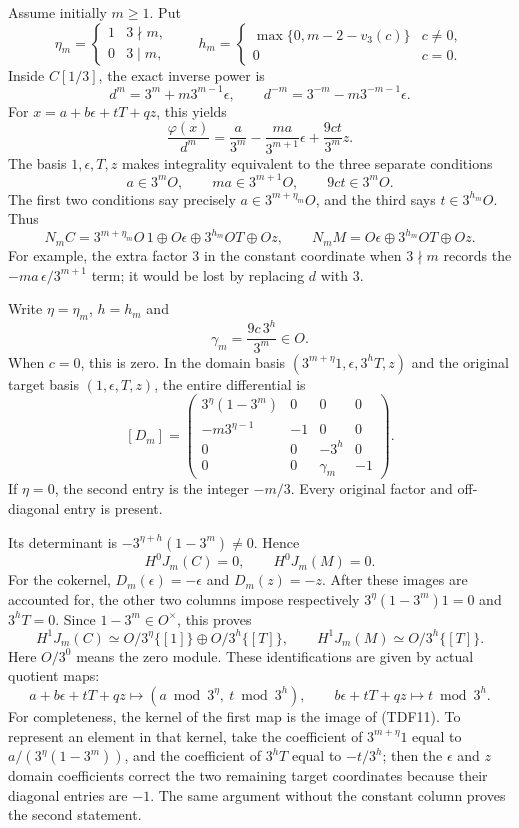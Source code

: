 \documentclass[
  10pt,
]{article}
\begin{document}
Assume initially \(m\geq1\). Put \[
 \eta_m=\begin{cases}1&3\nmid m,\\0&3\mid m,\end{cases}
 \qquad
 h_m=\begin{cases}
 \max\{0,m-2-v_3(c)\}&c\ne0,\\
 0&c=0.
 \end{cases}
 \tag{TDF7}
\] Inside \(C[1/3]\), the exact inverse power is \[
 d^m=3^m+m3^{m-1}\epsilon,\qquad
 d^{-m}=3^{-m}-m3^{-m-1}\epsilon.
 \tag{TDF8}
\] For \(x=a+b\epsilon+tT+qz\), this yields \[
 \frac{\varphi(x)}{d^m}
 =\frac{a}{3^m}
  -\frac{ma}{3^{m+1}}\epsilon
  +\frac{9ct}{3^m}z.
 \tag{TDF9}
\] The basis \(1,\epsilon,T,z\) makes integrality equivalent to the
three separate conditions \[
 a\in3^mO,\qquad ma\in3^{m+1}O,\qquad 9ct\in3^mO.
\] The first two conditions say precisely \(a\in3^{m+\eta_m}O\), and the
third says \(t\in3^{h_m}O\). Thus \[
 N_mC
 =3^{m+\eta_m}O\,1\oplus O\epsilon
   \oplus3^{h_m}OT\oplus Oz,
 \qquad
 N_mM=O\epsilon\oplus3^{h_m}OT\oplus Oz.
 \tag{TDF10}
\] For example, the extra factor \(3\) in the constant coordinate when
\(3\nmid m\) records the \(-ma\,\epsilon/3^{m+1}\) term; it would be
lost by replacing \(d\) with \(3\).

Write \(\eta=\eta_m\), \(h=h_m\) and \[
 \gamma_m=\frac{9c\,3^h}{3^m}\in O.
\] When \(c=0\), this is zero. In the domain basis
\((3^{m+\eta}1,\epsilon,3^hT,z)\) and the original target basis
\((1,\epsilon,T,z)\), the entire differential is \[
 [D_m]=
 \begin{pmatrix}
 3^\eta(1-3^m)&0&0&0\\
 -m3^{\eta-1}&-1&0&0\\
 0&0&-3^h&0\\
 0&0&\gamma_m&-1
 \end{pmatrix}.
 \tag{TDF11}
\] If \(\eta=0\), the second entry is the integer \(-m/3\). Every
original factor and off-diagonal entry is present.

Its determinant is \(-3^{\eta+h}(1-3^m)\ne0\). Hence \[
 H^0J_m(C)=0,\qquad H^0J_m(M)=0.
 \tag{TDF12}
\] For the cokernel, \(D_m(\epsilon)=-\epsilon\) and \(D_m(z)=-z\).
After these images are accounted for, the other two columns impose
respectively \(3^\eta(1-3^m)1=0\) and \(3^hT=0\). Since
\(1-3^m\in O^\times\), this proves \[
 H^1J_m(C)\simeq O/3^\eta\{[1]\}\oplus O/3^h\{[T]\},
 \qquad
 H^1J_m(M)\simeq O/3^h\{[T]\}.
 \tag{TDF13}
\] Here \(O/3^0\) means the zero module. These identifications are given
by actual quotient maps: \[
 a+b\epsilon+tT+qz\longmapsto
 (a\bmod3^\eta,\ t\bmod3^h),
 \qquad
 b\epsilon+tT+qz\longmapsto t\bmod3^h.
 \tag{TDF14}
\] For completeness, the kernel of the first map is the image of
(TDF11). To represent an element in that kernel, take the coefficient of
\(3^{m+\eta}1\) equal to \(a/(3^\eta(1-3^m))\), and the coefficient of
\(3^hT\) equal to \(-t/3^h\); then the \(\epsilon\) and \(z\) domain
coefficients correct the two remaining target coordinates because their
diagonal entries are \(-1\). The same argument without the constant
column proves the second statement.
\end{document}
